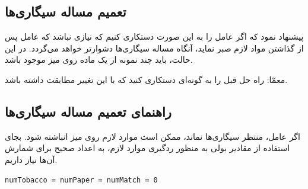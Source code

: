 \documentclass{book}
\newcommand{\clearemptydoublepage}{\newpage\cleardoublepage}
\begin{document}

\subsection{تعمیم مساله سیگاری‌ها}

     پیشنهاد نمود که اگر عامل را به این صورت دستکاری کنیم 
    که نیازی نباشد که عامل پس از گذاشتن مواد لازم صبر نماید، آنگاه مساله سیگاری‌ها دشوارتر خواهد می‌گردد. 
    در این حالت، باید چند نمونه از یک ماده روی میز موجود باشد. 

    معمّا: راه حل قبل را به گونه‌ای دستکاری کنید که با این تغییر مطابقت داشته باشد. 

\clearemptydoublepage
\subsection{راهنمای تعمیم مساله سیگاری‌ها}

    اگر عامل، منتظر سیگاری‌ها نماند، ممکن است موارد لازم روی میز انباشته شود. بجای استفاده از مقادیر بولی به منظور ردگیری موارد لازم، 
    به اعداد صحیح برای شمارش آن‌ها نیاز داریم. 

\begin{latin}
\begin{latin}
\begin{lstlisting}[title=\rl{راهنمای تعمیم مساله سیگاری‌ها}]
numTobacco = numPaper = numMatch = 0
\end{lstlisting}
\end{latin}
\end{latin}


\clearemptydoublepage
\end{document}
